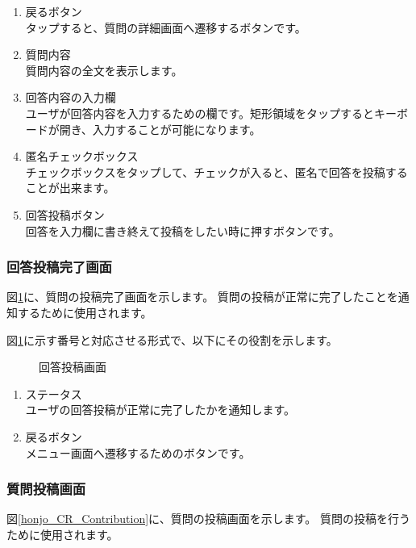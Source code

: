 \documentclass[a4j]{jarticle}
\begin{document}
\begin{enumerate}
  \renewcommand{\labelenumi}{\textcircled{\scriptsize \theenumi}}
  \item 戻るボタン\\
        タップすると、質問の詳細画面へ遷移するボタンです。
  \item 質問内容\\
        質問内容の全文を表示します。
  \item 回答内容の入力欄\\
        ユーザが回答内容を入力するための欄です。矩形領域をタップするとキーボードが開き、入力することが可能になります。
  \item 匿名チェックボックス\\
        チェックボックスをタップして、チェックが入ると、匿名で回答を投稿することが出来ます。
  \item 回答投稿ボタン\\
        回答を入力欄に書き終えて投稿をしたい時に押すボタンです。
\end{enumerate}

\subsubsection{回答投稿完了画面}
図\ref{honjo_CR_CompleteAnswer}に、質問の投稿完了画面を示します。
質問の投稿が正常に完了したことを通知するために使用されます。

図\ref{honjo_CR_CompleteAnswer}に示す番号と対応させる形式で、以下にその役割を示します。

\begin{figure}[H]
    \begin{center}
    \caption {回答投稿画面}
    \label{honjo_CR_CompleteAnswer}
    \end{center}
\end{figure}

\begin{enumerate}
  \renewcommand{\labelenumi}{\textcircled{\scriptsize \theenumi}}
  \item ステータス\\
        ユーザの回答投稿が正常に完了したかを通知します。
  \item 戻るボタン\\
        メニュー画面へ遷移するためのボタンです。
\end{enumerate}


\subsubsection{質問投稿画面}
図\ref{honjo_CR_Contribution}に、質問の投稿画面を示します。
質問の投稿を行うために使用されます。
\end{document}
